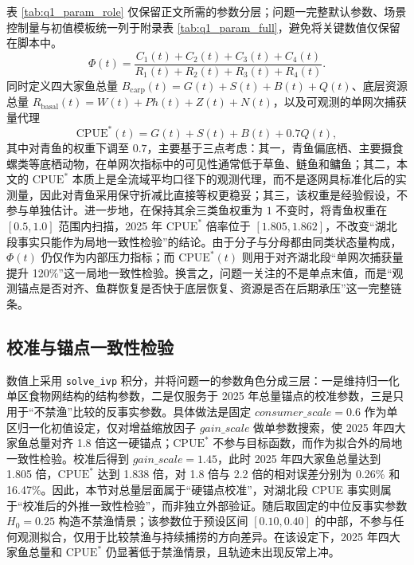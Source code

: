 \documentclass{MMCStyle}
\begin{document}
表 \ref{tab:q1_param_role} 仅保留正文所需的参数分层；问题一完整默认参数、场景控制量与初值模板统一列于附录表 \ref{tab:q1_param_full}，避免将关键数值仅保留在脚本中。
\begin{equation}
\Phi(t)=\frac{C_1(t)+C_2(t)+C_3(t)+C_4(t)}{R_1(t)+R_2(t)+R_3(t)+R_4(t)}.
\end{equation}
同时定义四大家鱼总量 $B_{\text{carp}}(t)=G(t)+S(t)+B(t)+Q(t)$、底层资源总量 $R_{\text{basal}}(t)=W(t)+Ph(t)+Z(t)+N(t)$，以及可观测的单网次捕获量代理
\begin{equation}
\mathrm{CPUE}^*(t)=G(t)+S(t)+B(t)+0.7Q(t),
\end{equation}
其中对青鱼的权重下调至 $0.7$，主要基于三点考虑：其一，青鱼偏底栖、主要摄食螺类等底栖动物，在单网次指标中的可见性通常低于草鱼、鲢鱼和鳙鱼；其二，本文的 $\mathrm{CPUE}^*$ 本质上是全流域平均口径下的观测代理，而不是逐网具标准化后的实测量，因此对青鱼采用保守折减比直接等权更稳妥；其三，该权重是经验假设，不参与单独估计。进一步地，在保持其余三类鱼权重为 $1$ 不变时，将青鱼权重在 $[0.5,1.0]$ 范围内扫描，2025 年 $\mathrm{CPUE}^*$ 倍率位于 $[1.805,1.862]$，不改变“湖北段事实只能作为局地一致性检验”的结论。由于分子与分母都由同类状态量构成，$\Phi(t)$ 仍仅作为内部压力指标；而 $\mathrm{CPUE}^*(t)$ 则用于对齐湖北段“单网次捕获量提升 120\%”这一局地一致性检验\cite{maunder2004,maunder2006}。换言之，问题一关注的不是单点末值，而是“观测锚点是否对齐、鱼群恢复是否快于底层恢复、资源是否在后期承压”这一完整链条。

\subsection{校准与锚点一致性检验}
数值上采用 \texttt{solve\_ivp} 积分，并将问题一的参数角色分成三层：一是维持归一化单区食物网结构的结构参数，二是仅服务于 2025 年总量锚点的校准参数，三是只用于“不禁渔”比较的反事实参数。具体做法是固定 $consumer\_scale=0.6$ 作为单区归一化初值设定，仅对增益缩放因子 $gain\_scale$ 做单参数搜索，使 2025 年四大家鱼总量对齐 1.8 倍这一硬锚点；$\mathrm{CPUE}^*$ 不参与目标函数，而作为拟合外的局地一致性检验。校准后得到 $gain\_scale=1.45$，此时 2025 年四大家鱼总量达到 1.805 倍，$\mathrm{CPUE}^*$ 达到 1.838 倍，对 1.8 倍与 2.2 倍的相对误差分别为 0.26\% 和 16.47\%。因此，本节对总量层面属于“硬锚点校准”，对湖北段 CPUE 事实则属于“校准后的外推一致性检验”，而非独立外部验证。随后取固定的中位反事实参数 $H_0=0.25$ 构造不禁渔情景；该参数位于预设区间 $[0.10,0.40]$ 的中部，不参与任何观测拟合，仅用于比较禁渔与持续捕捞的方向差异。在该设定下，2025 年四大家鱼总量和 $\mathrm{CPUE}^*$ 仍显著低于禁渔情景，且轨迹未出现反常上冲。
\end{document}
